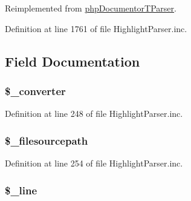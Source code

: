 \-Reimplemented from \hyperlink{classphp_documentor_t_parser_aabc41000dbb16c9e2f3fc4750941906a}{php\-Documentor\-T\-Parser}.



\-Definition at line 1761 of file \-Highlight\-Parser.\-inc.




\subsection{\-Field \-Documentation}
\hypertarget{classphp_documentor___highlight_parser_ab1905bb921f2d310a79457ffb9552f7b}{
\subsubsection[{\$\-\_\-converter}]{\setlength{\rightskip}{0pt plus 5cm}\$\-\_\-converter}}\label{classphp_documentor___highlight_parser_ab1905bb921f2d310a79457ffb9552f7b}


\-Definition at line 248 of file \-Highlight\-Parser.\-inc.

\hypertarget{classphp_documentor___highlight_parser_ae623f634db8825cbb896c2e0e2d03447}{
\subsubsection[{\$\-\_\-filesourcepath}]{\setlength{\rightskip}{0pt plus 5cm}\$\-\_\-filesourcepath}}\label{classphp_documentor___highlight_parser_ae623f634db8825cbb896c2e0e2d03447}


\-Definition at line 254 of file \-Highlight\-Parser.\-inc.

\hypertarget{classphp_documentor___highlight_parser_a67c54106d6508a3fad8868fe68e1a264}{
\subsubsection[{\$\-\_\-line}]{\setlength{\rightskip}{0pt plus 5cm}\$\-\_\-line}}\label{classphp_documentor___highlight_parser_a67c54106d6508a3fad8868fe68e1a264}


